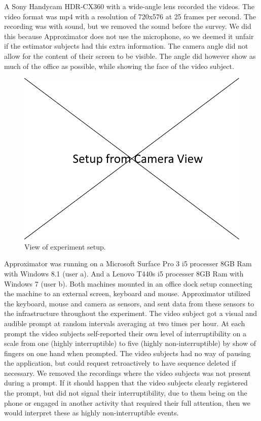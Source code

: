 \documentclass{sigchi}
\begin{document}
A Sony Handycam HDR-CX360 with a wide-angle lens recorded the videos.
The video format was mp4 with a resolution of 720x576 at 25 frames per second.
The recording was with sound, but we removed the sound before the survey.
We did this because Approximator does not use the microphone, so we deemed it unfair if the estimator subjects had this extra information.
The camera angle did not allow for the content of their screen to be visible.
The angle did however show as much of the office as possible, while showing the face of the video subject.

\begin{figure}
  \centering
  \includegraphics[width=\columnwidth]{figures/experiment_setup.png}
  \caption{View of experiment setup.}
  \label{fig:experiment}
\end{figure}

Approximator was running on a Microsoft Surface Pro 3 i5 processer 8GB Ram with Windows 8.1 (user a).
And a Lenovo T440s i5 processer 8GB Ram with Windows 7 (user b).
Both machines mounted in an office dock setup connecting the machine to an external screen, keyboard and mouse.
Approximator utilized the keyboard, mouse and camera as sensors, and sent data from these sensors to the infrastructure throughout the experiment.
The video subject got a visual and audible prompt at random intervals averaging at two times per hour.
At each prompt the video subjects self-reported their own level of interruptibility on a scale from one (highly interruptible) to five (highly non-interruptible) by show of fingers on one hand when prompted.
The video subjects had no way of pausing the application, but could request retroactively to have sequence deleted if necessary.
We removed the recordings where the video subjects was not present during a prompt.
If it should happen that the video subjects clearly registered the prompt, but did not signal their interruptibility, due to them being on the phone or engaged in another activity that required their full attention, then we would interpret these as highly non-interruptible events.
\end{document}
